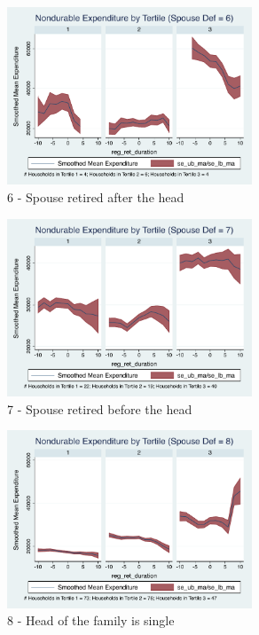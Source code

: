 \documentclass[11pt,onecolumn]{article}
\numberwithin{figure}{section}
\begin{document}
\begin{figure}[h]
	\caption{6 - Spouse retired after the head}
	\centering
	\includegraphics[width=0.65\textwidth]{../ConsumptionPostRetirement_by_SpouseDef/Smoothed/spouse_def_6.pdf}
\end{figure}
\clearpage

\begin{figure}[h]
	\caption{7 - Spouse retired before the head}
	\centering
	\includegraphics[width=0.65\textwidth]{../ConsumptionPostRetirement_by_SpouseDef/Smoothed/spouse_def_7.pdf}
\end{figure}

\begin{figure}[h]
	\caption{8 - Head of the family is single}
	\centering
	\includegraphics[width=0.65\textwidth]{../ConsumptionPostRetirement_by_SpouseDef/Smoothed/spouse_def_8.pdf}
\end{figure}
\end{document}
